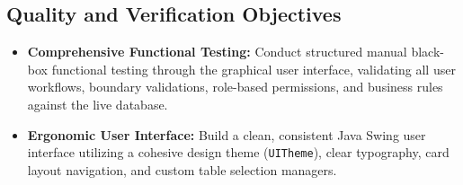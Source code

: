 \subsection{Quality and Verification Objectives}
\begin{itemize}
    \item \textbf{Comprehensive Functional Testing:} Conduct structured manual black-box functional testing through the graphical user interface, validating all user workflows, boundary validations, role-based permissions, and business rules against the live database.
    \item \textbf{Ergonomic User Interface:} Build a clean, consistent Java Swing user interface utilizing a cohesive design theme (\texttt{UITheme}), clear typography, card layout navigation, and custom table selection managers.
\end{itemize}
